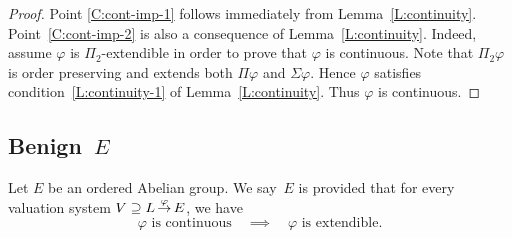 \documentclass[main.tex]{subfiles}
\begin{document}
\begin{proof}
Point \ref{C:cont-imp-1}
follows immediately from Lemma~\ref{L:continuity}.
Point~\ref{C:cont-imp-2} is also
a consequence of Lemma~\ref{L:continuity}.
Indeed, 
assume $\varphi$ is $\Pi_2$-extendible
in order to prove that $\varphi$ is continuous.
Note that $\Pi_2 \varphi$
is order preserving and
extends both $\Pi\varphi$ and $\Sigma\varphi$.
Hence $\varphi$ satisfies condition~\ref{L:continuity-1}
of Lemma~\ref{L:continuity}.
Thus $\varphi$ is continuous.
\end{proof}
%
%
\subsection{Benign~$E$}
\begin{dfn}
\label{D:benign}
Let $E$ be an ordered Abelian group.
We say~$E$ is  provided 
that for every valuation system
$V \supseteq L\,\smash{\stackrel{\varphi}{\rightarrow}}\,E$,
we have
\begin{equation*}
\varphi\text{ is continuous}
\quad\implies\quad
\varphi\text{ is extendible}.
\end{equation*}
\end{dfn}
\end{document}
